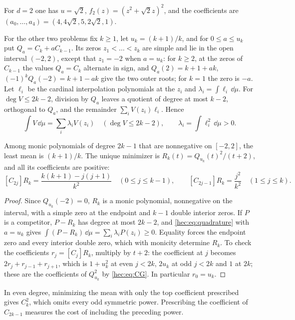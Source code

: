 For $d=2$ one has $u=\sqrt2$, $f_2(z)=(z^2+\sqrt2z)^2$, and the coefficients are
$(a_0,\dots,a_4)=(4,4\sqrt2,5,2\sqrt2,1)$.

For the other two problems fix $k\ge1$, let $u_k=(k+1)/k$, and for $0\le a\le u_k$ put
$Q_a=C_k+aC_{k-1}$. Its zeros $z_1<\dots<z_k$ are simple and lie in the open interval $(-2,2)$, except that
$z_1=-2$ when $a=u_k$: for $k\ge2$, at the zeros of $C_{k-1}$ the values $Q_a=C_k$ alternate in sign, and
$Q_a(2)=k+1+ak$, $(-1)^kQ_a(-2)=k+1-ak$ give the two outer roots; for $k=1$ the zero is $-a$. Let $\ell_i$
be the cardinal interpolation polynomials at the $z_i$ and $\lambda_i=\int\ell_i\,\dd\mu$. For
$\deg V\le2k-2$, division by $Q_a$ leaves a quotient of degree at most $k-2$, orthogonal to $Q_a$, and the
remainder $\sum_iV(z_i)\ell_i$. Hence
\begin{equation}\label{hec:eq:quadrature}
 \int V\,\dd\mu=\sum_i\lambda_iV(z_i)\quad(\deg V\le2k-2),\qquad\lambda_i=\int\ell_i^2\,\dd\mu>0 .
\end{equation}

\begin{proposition}\label{hec:prop:odd}
Among monic polynomials of degree $2k-1$ that are nonnegative on $[-2,2]$, the least mean is $(k+1)/k$. The
unique minimizer is $R_k(t)=Q_{u_k}(t)^2/(t+2)$, and all its coefficients are positive:
\[
 [C_{2j}]R_k=\frac{k(k+1)-j(j+1)}{k^2}\quad(0\le j\le k-1),\qquad
 [C_{2j-1}]R_k=\frac{j^2}{k^2}\quad(1\le j\le k).
\]
\end{proposition}

\begin{proof}
Since $Q_{u_k}(-2)=0$, $R_k$ is a monic polynomial, nonnegative on the interval, with a simple zero at the
endpoint and $k-1$ double interior zeros. If $P$ is a competitor, $P-R_k$ has degree at most $2k-2$, and
\eqref{hec:eq:quadrature} with $a=u_k$ gives $\int(P-R_k)\,\dd\mu=\sum_i\lambda_iP(z_i)\ge0$. Equality
forces the endpoint zero and every interior double zero, which with monicity determine $R_k$. To check
the coefficients $r_j=[C_j]R_k$, multiply by $t+2$: the coefficient at $j$ becomes
$2r_j+r_{j-1}+r_{j+1}$, which is $1+u_k^2$ at even $j<2k$, $2u_k$ at odd $j<2k$ and $1$ at $2k$; these are
the coefficients of $Q_{u_k}^2$ by \eqref{hec:eq:CG}. In particular $r_0=u_k$.
\end{proof}

In even degree, minimizing the mean with only the top coefficient prescribed gives $C_k^2$, which omits
every odd symmetric power. Prescribing the coefficient of $C_{2k-1}$ measures the cost of including the
preceding power.

